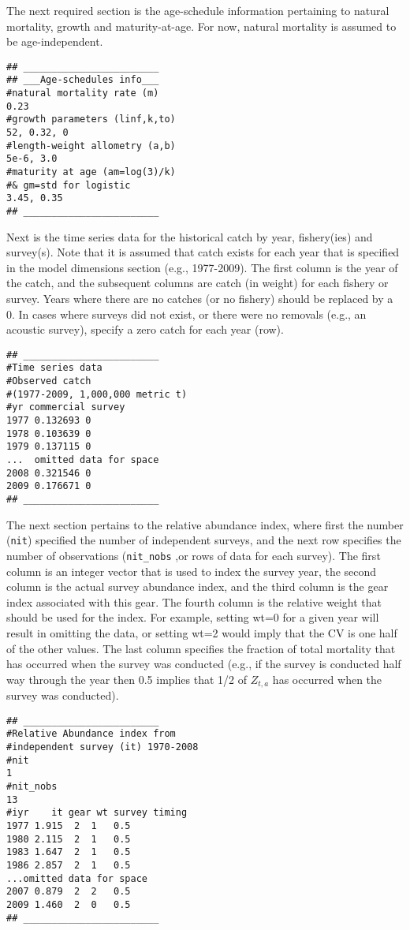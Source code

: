 \begin{multicols}{2}
The next required section is the age-schedule information pertaining to natural mortality, growth and maturity-at-age. For now, natural mortality is assumed to be age-independent.
\begin{verbatim}
## ________________________
## ___Age-schedules info___
#natural mortality rate (m)
0.23
#growth parameters (linf,k,to)
52, 0.32, 0
#length-weight allometry (a,b)
5e-6, 3.0
#maturity at age (am=log(3)/k) 
#& gm=std for logistic
3.45, 0.35
## ________________________
\end{verbatim}

Next is the time series data for the historical catch by year, fishery(ies) and survey(s).  Note that it is assumed that catch exists for each year that is specified in the model dimensions section (e.g., 1977-2009).  The first column is the year of the catch, and the subsequent columns are catch (in weight) for each fishery or survey.  Years where there are no catches (or no fishery) should be replaced by a 0.  In cases where surveys did not exist, or there were no removals (e.g., an acoustic survey), specify a zero catch for each year (row).  
\begin{verbatim}
## ________________________
#Time series data
#Observed catch 
#(1977-2009, 1,000,000 metric t)
#yr	commercial survey
1977 0.132693 0
1978 0.103639 0
1979 0.137115 0
...  omitted data for space
2008 0.321546 0
2009 0.176671 0
## ________________________
\end{verbatim}

The next section pertains to the relative abundance index, where first the number (\texttt{nit}) specified the number of independent surveys, and the next row specifies the number of observations (\texttt{nit\_nobs} ,or rows of data for each survey).  The first column is an integer vector that is used to index the survey year, the second column is the actual survey abundance index, and the third column is the gear index associated with this gear.  The fourth column is the relative weight that should be used for the index.  For example, setting wt=0 for a given year will result in omitting the data, or setting wt=2 would imply that the CV is one half of the other values.  The last column specifies the fraction of total mortality that has occurred when the survey was conducted (e.g., if the survey is conducted half way through the year then 0.5 implies that 1/2 of $Z_{t,a}$ has occurred when the survey was conducted).
\begin{verbatim}
## ________________________
#Relative Abundance index from 
#independent survey (it) 1970-2008
#nit
1
#nit_nobs
13
#iyr    it gear wt survey timing
1977 1.915  2  1   0.5
1980 2.115  2  1   0.5
1983 1.647  2  1   0.5
1986 2.857  2  1   0.5
...omitted data for space
2007 0.879  2  2   0.5
2009 1.460  2  0   0.5
## ________________________
\end{verbatim}


\end{multicols}
